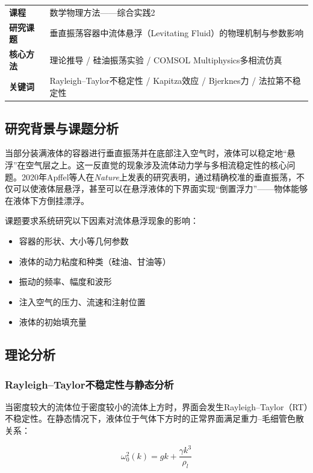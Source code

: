 \documentclass[12pt,a4paper]{ctexart}
\begin{document}
\begin{infobox}[项目概况]
\begin{tabular}{ll}
\textbf{课程} & 数学物理方法——综合实践2 \\
\textbf{研究课题} & 垂直振荡容器中流体悬浮（Levitating Fluid）的物理机制与参数影响 \\
\textbf{核心方法} & 理论推导 / 硅油振荡实验 / COMSOL Multiphysics多相流仿真 \\
\textbf{关键词} & Rayleigh--Taylor不稳定性 / Kapitza效应 / Bjerknes力 / 法拉第不稳定性
\end{tabular}
\end{infobox}

\subsection{研究背景与课题分析}

当部分装满液体的容器进行垂直振荡并在底部注入空气时，液体可以稳定地``悬浮''在空气层之上。这一反直觉的现象涉及流体动力学与多相流稳定性的核心问题。2020年Apffel等人在\textit{Nature}上发表的研究表明，通过精确校准的垂直振荡，不仅可以使液体层悬浮，甚至可以在悬浮液体的下界面实现``倒置浮力''——物体能够在液体下方倒挂漂浮。

课题要求系统研究以下因素对流体悬浮现象的影响：

\begin{itemize}
    \item 容器的形状、大小等几何参数
    \item 液体的动力粘度和种类（硅油、甘油等）
    \item 振动的频率、幅度和波形
    \item 注入空气的压力、流速和注射位置
    \item 液体的初始填充量
\end{itemize}

\subsection{理论分析}

\subsubsection{Rayleigh--Taylor不稳定性与静态分析}

当密度较大的流体位于密度较小的流体上方时，界面会发生Rayleigh--Taylor（RT）不稳定性。在静态情况下，液体位于气体下方时的正常界面满足重力--毛细管色散关系：

\begin{equation}
\omega_0^2(k) = gk + \frac{\gamma k^3}{\rho_l}
\end{equation}
\end{document}
